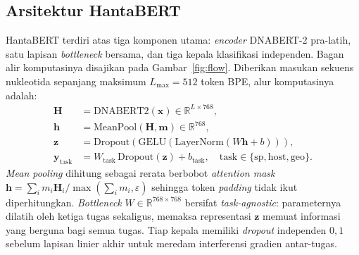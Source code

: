 \documentclass[conference]{IEEEtran}
\begin{document}
\subsection{Arsitektur HantaBERT}

HantaBERT terdiri atas tiga komponen utama: \emph{encoder} DNABERT-2
pra-latih, satu lapisan \emph{bottleneck} bersama, dan tiga kepala
klasifikasi independen. Bagan alir komputasinya disajikan pada
Gambar~\ref{fig:flow}. Diberikan masukan sekuens nukleotida sepanjang
maksimum $L_{\max}=512$ token BPE, alur komputasinya adalah:
\[
\begin{aligned}
\mathbf{H} &= \text{DNABERT2}(\mathbf{x}) \in \mathbb{R}^{L \times 768}, \\
\mathbf{h} &= \text{MeanPool}(\mathbf{H}, \mathbf{m}) \in \mathbb{R}^{768}, \\
\mathbf{z} &= \text{Dropout}(\text{GELU}(\text{LayerNorm}(W\mathbf{h}\!+\!b))), \\
\mathbf{y}_{\text{task}} &= W_{\text{task}}\,\text{Dropout}(\mathbf{z}) + b_{\text{task}},
\quad \text{task} \in \{\text{sp},\text{host},\text{geo}\}.
\end{aligned}
\]
\emph{Mean pooling} dihitung sebagai rerata berbobot \emph{attention mask}
\(
\mathbf{h} = \sum_i m_i \mathbf{H}_i / \max(\sum_i m_i, \varepsilon)
\)
sehingga token \emph{padding} tidak ikut diperhitungkan. \emph{Bottleneck}
$W \in \mathbb{R}^{768\times 768}$ bersifat \emph{task-agnostic}:
parameternya dilatih oleh ketiga tugas sekaligus, memaksa representasi
$\mathbf{z}$ memuat informasi yang berguna bagi semua tugas. Tiap kepala
memiliki \emph{dropout} independen $0{,}1$ sebelum lapisan linier akhir
untuk meredam interferensi gradien antar-tugas.
\end{document}
